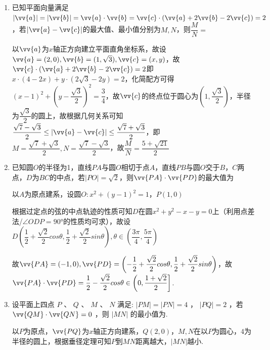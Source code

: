 \begin{enumerate}
\begin{enumerate}
        \item 已知平面向量满足$|\vv{a}| = |\vv{b}| = \vv{a} \cdot \vv{b} = \vv{c} \cdot (\vv{a} + 2\vv{b}-2\vv{c}) = 2$，若$|\vv{a} - \vv{c}|$的最大值、最小值分别为$M, N$，则$\dfrac{M}{N} = $
        \begin{jieda}
            以$\vv{a}$为$x$轴正方向建立平面直角坐标系，故设$\vv{a} = (2, 0), \vv{b} = (1, \sqrt{3}), \vv{c} = (x, y)$，故$\vv{c} \cdot (\vv{a} + 2\vv{b}-2\vv{c}) = 2$即$x \cdot (4-2x) + y \cdot (2\sqrt{3} - 2y) = 2$，化简配方可得$(x-1)^2 + (y - \dfrac{\sqrt{3}}{2})^2 = \dfrac{3}{4}$，故$\vv{c}$的终点位于圆心为$(1, \dfrac{\sqrt{3}}{2})$，半径为$\dfrac{\sqrt{3}}{2}$的圆上，故根据几何关系可知$\dfrac{\sqrt{7} - \sqrt{3}}{2} \leq |\vv{a} - \vv{c}| \leq \dfrac{\sqrt{7} + \sqrt{3}}{2}$，即$M = \dfrac{\sqrt{7}+\sqrt{3}}{2}, N = \dfrac{\sqrt{7} - \sqrt{3}}{2}$，故$\dfrac{M}{N} = \dfrac{5+\sqrt{21}}{2}$
        \end{jieda}
        
        \item 已知圆$O$的半径为1，直线$PA$与圆$O$相切于点$A$，直线$PB$与圆$O$交于$B$，$C$两点，$D$为$BC$的中点，若$|PO| = \sqrt{2}$，则$\vv{PA} \cdot \vv{PD}$的最大值为
        \begin{jieda}
            以$A$为原点建系，设圆$O:x^2+(y-1)^2 = 1$，$P(1, 0)$

            根据过定点的弦的中点轨迹的性质可知$D$在圆$x^2 + y^2 - x - y = 0$上（利用点差法/$\angle ODP = \ang{90}$的性质均可求），故设$D\left(\dfrac{1}{2}+\dfrac{\sqrt{2}}{2}cos\theta, \dfrac{1}{2}+\dfrac{\sqrt{2}}{2}sin\theta\right), \theta \in \left(\dfrac{3\pi}{4}, \dfrac{5\pi}{4}\right)$
            
            故$\vv{PA} = (-1, 0), \vv{PD} = \left(-\dfrac{1}{2}+\dfrac{\sqrt{2}}{2}cos\theta, \dfrac{1}{2}+\dfrac{\sqrt{2}}{2}sin\theta\right)$，故$\vv{PA}  \cdot \vv{PD} = \dfrac{1}{2}-\dfrac{\sqrt{2}}{2}cos\theta \in \left(0, \dfrac{1+\sqrt{2}}{2}\right]$.
        \end{jieda}

        \item 设平面上四点 $P$ 、 $Q$ 、 $M$ 、 $N$ 满足: $\left| {PM}\right|  = \left| {PN}\right|  = 4$ ， $\left| {PQ}\right|  = 2$ ，若 $\vv{QM} \cdot  \vv{QN} = 0$ ，则 $\left| {MN}\right|$ 的最小值为.
        \begin{jieda}
            以$P$为原点，$\vv{PQ}$为$x$轴正方向建系，$Q(2, 0)$，$M,N$在以$P$为圆心，$4$为半径的圆上，根据垂径定理可知$P$到$MN$距离越大，$|MN|$越小.
            

\end{jieda}
\end{enumerate}
\end{enumerate}
